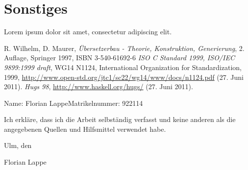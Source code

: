 \documentclass[a4paper,10pt
headsepline,           %
doubleside,            %
pointlessnumbers,      %
bibtotoc,              %
BCOR15mm,               %
leqno					%
]{scrbook}
\newcommand{\fullname}{Florian Lappe}
\newcommand{\matrikelnummer}{922114}
\begin{document}
\chapter{Sonstiges}

Lorem ipsum dolor sit amet, consectetur adipiscing elit.


\cleardoublepage %
{}
\listoffigures


\cleardoublepage %
{}
\listoftables


\cleardoublepage %
{}
\begin{thebibliography}{123}
	{\sc R. Wilhelm, D. Maurer},
	{\itshape Übersetzerbau - Theorie, Konstruktion, Generierung},
	2. Auflage, Springer 1997, ISBN 3-540-61692-6
	{\itshape ISO C Standard 1999, ISO/IEC 9899:1999 draft},
	WG14 N1124, International Organization for Standardization, 1999,
	\url{http://www.open-std.org/jtc1/sc22/wg14/www/docs/n1124.pdf} (27. Juni 2011).
	{\itshape Hugs 98},
	\url{http://www.haskell.org/hugs/} (27. Juni 2011).
\end{thebibliography}

\clearpage
\thispagestyle{empty}

\noindent Name: \fullname \hfill Matrikelnummer: \matrikelnummer \vspace{2cm}


Ich erkläre, dass ich die Arbeit selbständig verfasst und keine anderen als die angegebenen Quellen und Hilfsmittel verwendet habe.\vspace{2cm}

\noindent Ulm, den \dotfill

\hspace{10cm} {\footnotesize \fullname}
\end{document}
